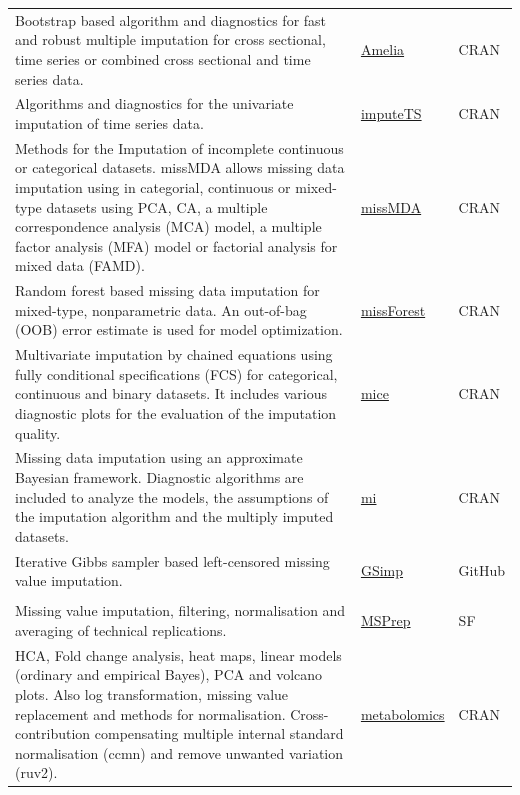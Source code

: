 \documentclass[]{article}
\begin{document}
\begin{longtable}{>{\raggedright\arraybackslash}p{30em}>{\raggedright\arraybackslash}p{10em}>{\raggedright\arraybackslash}p{3em}}
Bootstrap based algorithm and diagnostics for fast and robust multiple imputation for cross sectional, time series or combined cross sectional and time series data. & \href{https://cran.r-project.org/web/packages/Amelia/Amelia.pdf}{Amelia} & CRAN\\
\rowcolor{gray!6}  Algorithms and diagnostics for the univariate imputation of time series data. & \href{https://cran.r-project.org/package=imputeTS}{imputeTS} & CRAN\\
Methods for the Imputation of incomplete continuous or categorical datasets. missMDA allows missing data imputation using in categorial, continuous or mixed-type datasets using PCA, CA, a multiple correspondence analysis (MCA) model, a multiple factor analysis (MFA) model or factorial analysis for mixed data (FAMD). & \href{https://cran.r-project.org/package=missMDA}{missMDA} & CRAN\\
\rowcolor{gray!6}  Random forest based missing data imputation for mixed-type, nonparametric data. An out-of-bag (OOB) error estimate is used for model optimization. & \href{https://cran.r-project.org/web/packages/missForest/missForest.pdf}{missForest} & CRAN\\
Multivariate imputation by chained equations using fully conditional specifications (FCS) for categorical, continuous and binary datasets. It includes various diagnostic plots for the evaluation of the imputation quality. & \href{https://cran.r-project.org/web/packages/mice/mice.pdf}{mice} & CRAN\\
\rowcolor{gray!6}  Missing data imputation using an approximate Bayesian framework. Diagnostic algorithms are included to analyze the models, the assumptions of the imputation algorithm and the multiply imputed datasets. & \href{https://cran.r-project.org/package=mi}{mi} & CRAN\\
Iterative Gibbs sampler based left-censored missing value imputation. & \href{https://github.com/WandeRum/GSimp}{GSimp} & GitHub\\
\rowcolor{gray!6}  \addlinespace[0.3em]
\multicolumn{3}{l}{\textbf{Multiple workflow steps}}\\
Missing value imputation, filtering, normalisation and averaging of technical replications. & \href{https://sourceforge.net/projects/msprep/}{MSPrep} & SF\\
HCA, Fold change analysis, heat maps, linear models (ordinary and empirical Bayes), PCA and volcano plots. Also log transformation, missing value replacement and methods for normalisation. Cross-contribution compensating multiple internal standard normalisation (ccmn) and remove unwanted variation (ruv2). & \href{https://cran.r-project.org/package=metabolomics}{metabolomics} & CRAN\\

\end{longtable}
\end{document}
